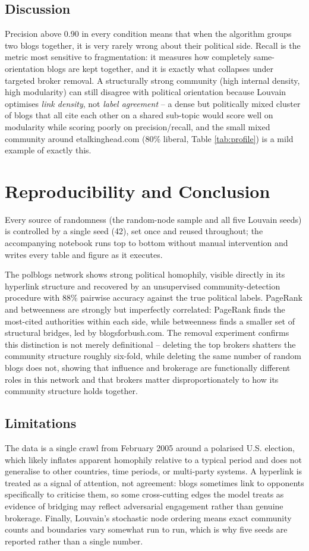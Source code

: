 \documentclass[10pt,twocolumn]{article}
\begin{document}
\subsection{Discussion}
Precision above 0.90 in every condition means that when the algorithm groups two blogs together, it
is very rarely wrong about their political side. Recall is the metric most sensitive to
fragmentation: it measures how completely same-orientation blogs are kept together, and it is
exactly what collapses under targeted broker removal. A structurally strong community (high internal
density, high modularity) can still disagree with political orientation because Louvain optimises
\emph{link density}, not \emph{label agreement} -- a dense but politically mixed cluster of blogs
that all cite each other on a shared sub-topic would score well on modularity while scoring poorly on
precision/recall, and the small mixed community around etalkinghead.com (80\% liberal, Table
\ref{tab:profile}) is a mild example of exactly this.

\section{Reproducibility and Conclusion}
Every source of randomness (the random-node sample and all five Louvain seeds) is controlled by a
single seed (42), set once and reused throughout; the accompanying notebook runs top to bottom
without manual intervention and writes every table and figure as it executes.

The polblogs network shows strong political homophily, visible directly in its hyperlink structure
and recovered by an unsupervised community-detection procedure with 88\% pairwise accuracy against
the true political labels. PageRank and betweenness are strongly but imperfectly correlated: PageRank
finds the most-cited authorities within each side, while betweenness finds a smaller set of
structural bridges, led by blogsforbush.com. The removal experiment confirms this distinction is not
merely definitional -- deleting the top brokers shatters the community structure roughly six-fold,
while deleting the same number of random blogs does not, showing that influence and brokerage are
functionally different roles in this network and that brokers matter disproportionately to how its
community structure holds together.

\subsection*{Limitations}
The data is a single crawl from February 2005 around a polarised U.S. election, which likely
inflates apparent homophily relative to a typical period and does not generalise to other countries,
time periods, or multi-party systems. A hyperlink is treated as a signal of attention, not agreement:
blogs sometimes link to opponents specifically to criticise them, so some cross-cutting edges the
model treats as evidence of bridging may reflect adversarial engagement rather than genuine
brokerage. Finally, Louvain's stochastic node ordering means exact community counts and boundaries
vary somewhat run to run, which is why five seeds are reported rather than a single number.
\end{document}
